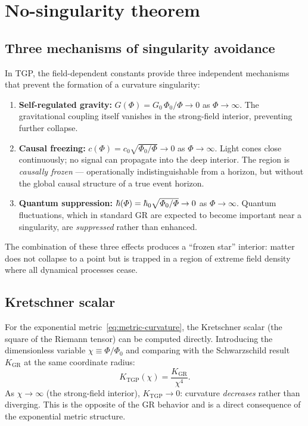 \documentclass[11pt,a4paper]{article}
\theoremstyle{definition}
\theoremstyle{remark}
\newcommand{\PhiZero}{\varPhi_0}
\renewcommand{\Phi}{\varPhi}
\begin{document}
\section{No-singularity theorem}\label{sec:no-sing}

\subsection{Three mechanisms of singularity avoidance}

In TGP, the field-dependent constants provide three independent
mechanisms that prevent the formation of a curvature singularity:

\begin{enumerate}[(1)]
\item \textbf{Self-regulated gravity:} $G(\Phi) = G_0\,\PhiZero/\Phi
  \to 0$ as $\Phi \to \infty$.  The gravitational coupling itself
  vanishes in the strong-field interior, preventing further collapse.

\item \textbf{Causal freezing:} $c(\Phi) = c_0\sqrt{\PhiZero/\Phi}
  \to 0$ as $\Phi \to \infty$.  Light cones close continuously; no
  signal can propagate into the deep interior.  The region is
  \emph{causally frozen} --- operationally indistinguishable from a
  horizon, but without the global causal structure of a true event
  horizon.

\item \textbf{Quantum suppression:} $\hbar(\Phi) = \hbar_0\sqrt{%
  \PhiZero/\Phi} \to 0$ as $\Phi \to \infty$.  Quantum fluctuations,
  which in standard GR are expected to become important near a
  singularity, are \emph{suppressed} rather than enhanced.
\end{enumerate}

The combination of these three effects produces a ``frozen star''
interior: matter does not collapse to a point but is trapped in a
region of extreme field density where all dynamical processes cease.

\subsection{Kretschner scalar}

For the exponential metric~\eqref{eq:metric-curvature}, the Kretschner
scalar (the square of the Riemann tensor) can be computed directly.
Introducing the dimensionless variable $\chi \equiv \Phi/\PhiZero$ and
comparing with the Schwarzschild result $K_{\mathrm{GR}}$ at the same
coordinate radius:
\begin{equation}\label{eq:kretschner}
  K_{\mathrm{TGP}}(\chi) = \frac{K_{\mathrm{GR}}}{\chi^4}.
\end{equation}
As $\chi \to \infty$ (the strong-field interior), $K_{\mathrm{TGP}}
\to 0$: curvature \emph{decreases} rather than diverging.  This is the
opposite of the GR behavior and is a direct consequence of the
exponential metric structure.
\end{document}
